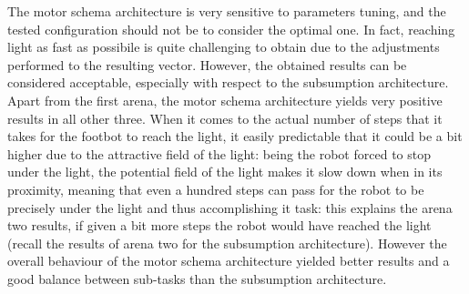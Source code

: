 The motor schema architecture is very sensitive to parameters tuning, and the
tested configuration should not be to consider the optimal one. In fact,
reaching light as fast as possibile is quite challenging to obtain due to the
adjustments performed to the resulting vector. However, the obtained results
can be considered acceptable, especially with respect to the subsumption
architecture. Apart from the first arena, the motor schema architecture yields
very positive results in all other three. When it comes to the actual number of
steps that it takes for the footbot to reach the light, it easily predictable
that it could be a bit higher due to the attractive field of the light: being
the robot forced to stop under the light, the potential field of the light
makes it slow down when in its proximity, meaning that even a hundred steps can
pass for the robot to be precisely under the light and thus accomplishing it
task: this explains the arena two results, if given a bit more steps the robot
would have reached the light (recall the results of arena two for the
subsumption architecture). However the overall behaviour of the motor schema
architecture yielded better results and a good balance between sub-tasks than
the subsumption architecture.
